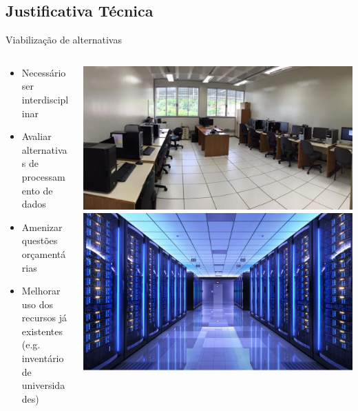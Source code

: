 \documentclass[10pt,brazil]{beamer}
\theoremstyle{definition}
\begin{document}
\subsection{Justificativa Técnica}

\begin{frame}{Viabilização de alternativas}
  \begin{columns}
    \begin{column}{0.5\textwidth}
      \begin{itemize}
            \item Necessário ser interdisciplinar
            \item Avaliar alternativas de processamento de dados 
            \item Amenizar questões orçamentá\-rias
            \item Melhorar uso dos recursos já exis\-tentes (e.g. inventário de universidades)
      \end{itemize}
  \end{column}
    \begin{column}{0.5\textwidth}  %
      \begin{center}
        \includegraphics[width=1\textwidth]{lab.jpg}        
        \includegraphics[width=1\textwidth]{hpc.jpeg}        
      \end{center}
    \end{column}
  \end{columns}
\end{frame}
\end{document}
